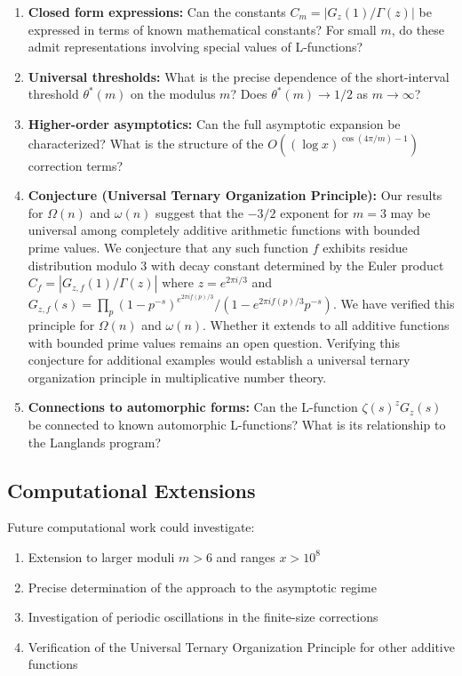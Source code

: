 \documentclass[12pt]{article}
\theoremstyle{definition}
\theoremstyle{remark}
\begin{document}
\begin{enumerate}
\item \textbf{Closed form expressions:} Can the constants $C_m = |G_z(1)/\Gamma(z)|$ be expressed in terms of known mathematical constants? For small $m$, do these admit representations involving special values of L-functions?

\item \textbf{Universal thresholds:} What is the precise dependence of the short-interval threshold $\theta^*(m)$ on the modulus $m$? Does $\theta^*(m) \to 1/2$ as $m \to \infty$?

\item \textbf{Higher-order asymptotics:} Can the full asymptotic expansion be characterized? What is the structure of the $O((\log x)^{\cos(4\pi/m) - 1})$ correction terms?

\item \textbf{Conjecture (Universal Ternary Organization Principle):} Our results for $\Omega(n)$ and $\omega(n)$ suggest that the $-3/2$ exponent for $m=3$ may be universal among completely additive arithmetic functions with bounded prime values. We conjecture that any such function $f$ exhibits residue distribution modulo 3 with decay constant determined by the Euler product $C_f = |G_{z,f}(1)/\Gamma(z)|$ where $z = e^{2\pi i/3}$ and $G_{z,f}(s) = \prod_p (1-p^{-s})^{e^{2\pi i f(p)/3}}/(1-e^{2\pi i f(p)/3}p^{-s})$. We have verified this principle for $\Omega(n)$ and $\omega(n)$. Whether it extends to all additive functions with bounded prime values remains an open question. Verifying this conjecture for additional examples would establish a universal ternary organization principle in multiplicative number theory.

\item \textbf{Connections to automorphic forms:} Can the L-function $\zeta(s)^z G_z(s)$ be connected to known automorphic L-functions? What is its relationship to the Langlands program?
\end{enumerate}

\subsection{Computational Extensions}

Future computational work could investigate:
\begin{enumerate}
\item Extension to larger moduli $m > 6$ and ranges $x > 10^8$
\item Precise determination of the approach to the asymptotic regime
\item Investigation of periodic oscillations in the finite-size corrections
\item Verification of the Universal Ternary Organization Principle for other additive functions
\end{enumerate}
\end{document}
